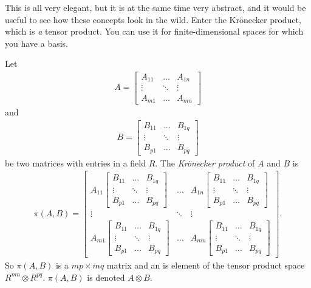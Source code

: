 This is all very elegant, but it is at the same time very abstract, and it would be useful to see how these concepts look in the wild.
Enter the Krönecker product, which is \emph{a} tensor product.
You can use it for finite-dimensional spaces for which you have a basis.
\begin{definition}
	Let
	\begin{align*}
		A =
		\begin{bmatrix}
			A_{11} & \dots & A_{1n}\\
			\vdots & \ddots & \vdots\\
			A_{m1} & \dots & A_{mn}
		\end{bmatrix}
	\end{align*}
	and
	\begin{align*}
		B =
		\begin{bmatrix}
			B_{11} & \dots & B_{1q}\\
			\vdots & \ddots & \vdots\\
			B_{p1} & \dots & B_{pq}
		\end{bmatrix}
	\end{align*}
	be two matrices with entries in a field $R$.
	The \emph{Krönecker product} of $A$ and $B$ is
	\begin{align*}
		\pi(A, B) =
		\begin{bmatrix}
			A_{11}
			\begin{bmatrix}
				B_{11} & \dots & B_{1q}\\
				\vdots & \ddots & \vdots\\
				B_{p1} & \dots & B_{pq}
			\end{bmatrix}
			& \dots &
			A_{1n}
			\begin{bmatrix}
				B_{11} & \dots & B_{1q}\\
				\vdots & \ddots & \vdots\\
				B_{p1} & \dots & B_{pq}
			\end{bmatrix}\\
			\vdots & \ddots & \vdots\\
			A_{m1}
			\begin{bmatrix}
				B_{11} & \dots & B_{1q}\\
				\vdots & \ddots & \vdots\\
				B_{p1} & \dots & B_{pq}
			\end{bmatrix}
			& \dots &
			A_{mn}
			\begin{bmatrix}
				B_{11} & \dots & B_{1q}\\
				\vdots & \ddots & \vdots\\
				B_{p1} & \dots & B_{pq}
			\end{bmatrix}
		\end{bmatrix}.
	\end{align*}
	So $\pi(A, B)$ is a $mp \times mq$ matrix and an is element of the tensor product space $R^{mn} \otimes R^{pq}$.
	$\pi(A, B)$ is denoted $A \otimes B$.
\end{definition}

